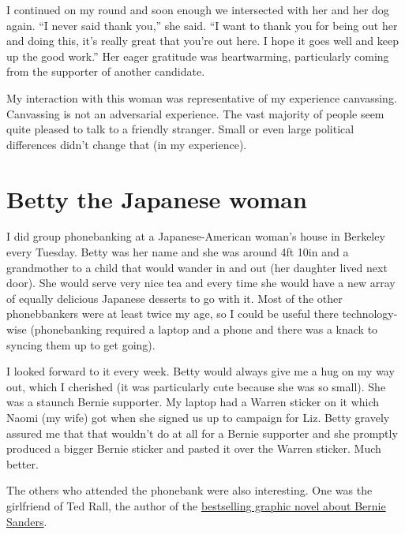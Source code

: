 \documentclass[]{book}
\begin{document}
I continued on my round and soon enough we intersected with her and her dog again. ``I never said thank you,'' she said. ``I want to thank you for being out her and doing this, it's really great that you're out here. I hope it goes well and keep up the good work.'' Her eager gratitude was heartwarming, particularly coming from the supporter of another candidate.

My interaction with this woman was representative of my experience canvassing. Canvassing is not an adversarial experience. The vast majority of people seem quite pleased to talk to a friendly stranger. Small or even large political differences didn't change that (in my experience).

\hypertarget{betty-the-japanese-woman}{%
\section{Betty the Japanese woman}\label{betty-the-japanese-woman}}

I did group phonebanking at a Japanese-American woman's house in Berkeley every Tuesday. Betty was her name and she was around 4ft 10in and a grandmother to a child that would wander in and out (her daughter lived next door). She would serve very nice tea and every time she would have a new array of equally delicious Japanese desserts to go with it. Most of the other phonebbankers were at least twice my age, so I could be useful there technology-wise (phonebanking required a laptop and a phone and there was a knack to syncing them up to get going).

I looked forward to it every week. Betty would always give me a hug on my way out, which I cherished (it was particularly cute because she was so small). She was a staunch Bernie supporter. My laptop had a Warren sticker on it which Naomi (my wife) got when she signed us up to campaign for Liz. Betty gravely assured me that that wouldn't do at all for a Bernie supporter and she promptly produced a bigger Bernie sticker and pasted it over the Warren sticker. Much better.

The others who attended the phonebank were also interesting. One was the girlfriend of Ted Rall, the author of the \href{https://www.penguinrandomhouse.com/books/536904/bernie-by-ted-rall/}{bestselling graphic novel about Bernie Sanders}.


\end{document}
